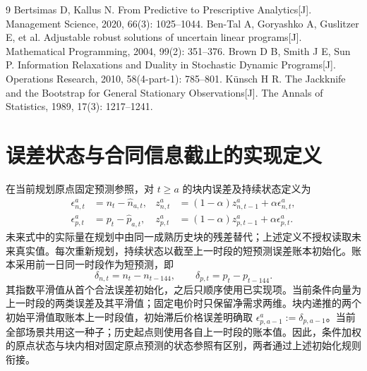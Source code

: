 \documentclass[UTF8,a4paper,zihao=-4,fontset=mac]{ctexart}
\begin{document}
\begin{thebibliography}{9}
Bertsimas D, Kallus N. From Predictive to Prescriptive Analytics[J]. Management Science, 2020, 66(3): 1025--1044.
Ben-Tal A, Goryashko A, Guslitzer E, et al. Adjustable robust solutions of uncertain linear programs[J]. Mathematical Programming, 2004, 99(2): 351--376.
Brown D B, Smith J E, Sun P. Information Relaxations and Duality in Stochastic Dynamic Programs[J]. Operations Research, 2010, 58(4-part-1): 785--801.
Künsch H R. The Jackknife and the Bootstrap for General Stationary Observations[J]. The Annals of Statistics, 1989, 17(3): 1217--1241.
\end{thebibliography}

\appendix
\section{误差状态与合同信息截止的实现定义}
在当前规划原点固定预测参照，对 \(t\ge a\) 的块内误差及持续状态定义为
\begin{align}
\epsilon_{n,t}^{a}&=n_t-\widehat n_{a,t},&
z_{n,t}^{a}&=(1-\alpha)z_{n,t-1}^{a}+\alpha\epsilon_{n,t}^{a},\\
\epsilon_{p,t}^{a}&=p_t-\widehat p_{a,t},&
z_{p,t}^{a}&=(1-\alpha)z_{p,t-1}^{a}+\alpha\epsilon_{p,t}^{a}.
\end{align}
未来式中的实际量在规划中由同一成熟历史块的残差替代；上述定义不授权读取未来真实值。每次重新规划，持续状态以截至上一时段的短预测误差账本初始化。账本采用前一日同一时段作为短预测，即
\begin{equation}
\delta_{n,t}=n_t-n_{t-144},\qquad \delta_{p,t}=p_t-p_{t-144}.
\end{equation}
其指数平滑值从首个合法误差初始化，之后只顺序使用已实现项。当前条件向量为上一时段的两类误差及其平滑值；固定电价时只保留净需求两维。块内递推的两个初始平滑值取账本上一时段值，初始滞后价格误差明确取 \(\epsilon_{p,a-1}^{a}:=\delta_{p,a-1}\)。当前全部场景共用这一种子；历史起点则使用各自上一时段的账本值。因此，条件加权的原点状态与块内相对固定原点预测的状态参照有区别，两者通过上述初始化规则衔接。
\end{document}

